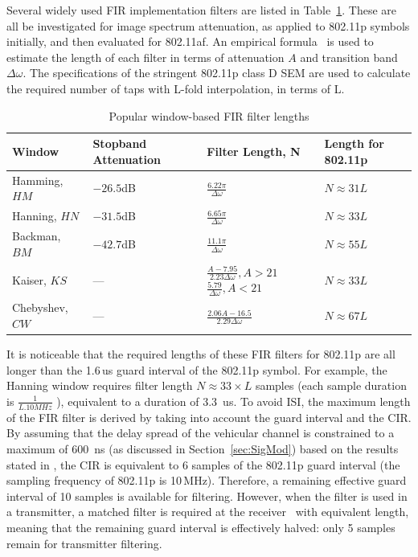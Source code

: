 Several widely used FIR implementation filters are listed in Table~\ref{tab:lengthFIR}. These are all be investigated for image spectrum attenuation, as applied to 802.11p symbols initially, and then evaluated for 802.11af.
An empirical formula~\cite{Kapadia2012} is used to estimate the length of each filter in terms of attenuation $A$ and transition band $\Delta\omega$.
The specifications of the stringent 802.11p class D SEM are used to calculate the required number of taps with L-fold interpolation, in terms of L.

\begin{table}[h]
	\centering
	\caption{Popular window-based FIR filter lengths}
	\label{tab:lengthFIR}
	\renewcommand{\arraystretch}{1.5}
	\begin{tabular}{@{}lp{2cm}p{3.4cm}p{2.5cm}@{}}
       \toprule
    		  Window 	& Stopband Attenuation  & Filter Length, N   & Length for 802.11p\\
    	\midrule
		Hamming, 	$HM$		& $-26.5$dB	& $\frac{6.22\pi}{\Delta\omega}$							&  $N \approx 31 L$ \\
		Hanning, $HN$				& $-31.5$dB	& $\frac{6.65\pi}{\Delta\omega}$							&  $N \approx 33 L$ \\
		Backman, $BM$			& $-42.7$dB	& $\frac{11.1\pi}{\Delta\omega}$							&  $N \approx 55 L$ \\
[1ex]		Kaiser, $KS$				& --- 		&\parbox{3cm}{	$\frac{A-7.95}{2.23 \Delta\omega}, A>21$ \\
[1ex]												$\frac{5.79}{\Delta\omega}, A<21$}			& $N \approx 33 L$ \\
[1ex]		Chebyshev, $CW$		      & ---		& $\frac{2.06A -16.5}{2.29 \Delta\omega}$					& $N \approx 67 L$ \\
    	\bottomrule
    \end{tabular}
\end{table}

It is noticeable that the required lengths of these FIR filters for 802.11p are all longer than the 1.6\,us guard interval of the 802.11p symbol.
For example, the Hanning window requires filter length $N \approx 33\times L$ samples (each sample duration is $\frac{1}{L.10MHz}$ ), equivalent to a duration of 3.3~us.
To avoid ISI, the maximum length of the FIR filter is derived by taking into account the guard interval and the CIR.
By assuming that the delay spread of the vehicular channel is constrained to a maximum of 600~ns (as discussed in Section~\ref{sec:SigMod}) based on the results stated in \cite{Acosta-Marum2007,Sen2008}, the CIR is equivalent to 6 samples of the 802.11p guard interval (the sampling frequency of 802.11p is 10\,MHz).
Therefore, a remaining effective guard interval of 10 samples is available for filtering.
However, when the filter is used in a transmitter, a matched filter is required at the receiver~\cite{farhang2008signal} with equivalent length, meaning that the remaining guard interval is effectively halved: only 5 samples remain for transmitter filtering.

